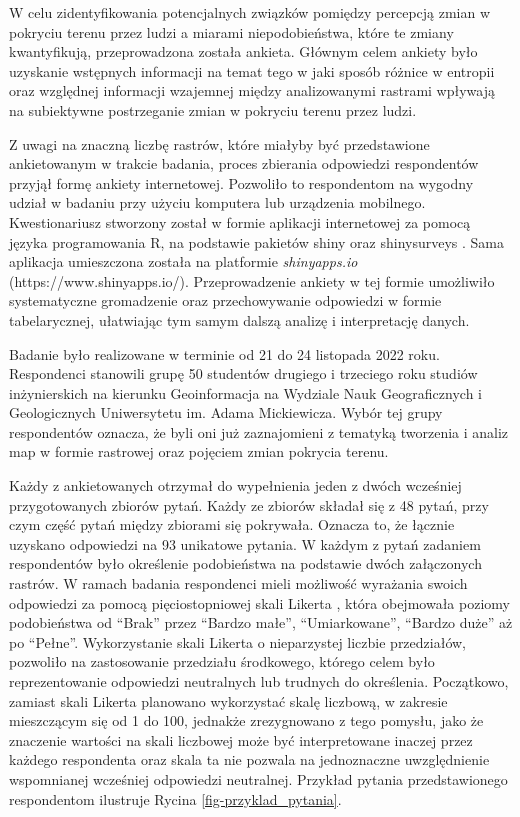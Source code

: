 \documentclass{amuthesis}
\begin{document}
W celu zidentyfikowania potencjalnych związków pomiędzy percepcją zmian
w pokryciu terenu przez ludzi a miarami niepodobieństwa, które te zmiany
kwantyfikują, przeprowadzona została ankieta. Głównym celem ankiety było
uzyskanie wstępnych informacji na temat tego w jaki sposób różnice w
entropii oraz względnej informacji wzajemnej między analizowanymi
rastrami wpływają na subiektywne postrzeganie zmian w pokryciu terenu
przez ludzi.

Z uwagi na znaczną liczbę rastrów, które miałyby być przedstawione
ankietowanym w trakcie badania, proces zbierania odpowiedzi respondentów
przyjął formę ankiety internetowej. Pozwoliło to respondentom na wygodny
udział w badaniu przy użyciu komputera lub urządzenia mobilnego.
Kwestionariusz stworzony został w formie aplikacji internetowej za
pomocą języka programowania R, na podstawie pakietów shiny
\autocite*{R-shiny} oraz shinysurveys \autocite*{R-shinysurveys}. Sama
aplikacja umieszczona została na platformie \emph{shinyapps.io}
(https://www.shinyapps.io/). Przeprowadzenie ankiety w tej formie
umożliwiło systematyczne gromadzenie oraz przechowywanie odpowiedzi w
formie tabelarycznej, ułatwiając tym samym dalszą analizę i
interpretację danych.

Badanie było realizowane w terminie od 21 do 24 listopada 2022 roku.
Respondenci stanowili grupę 50 studentów drugiego i trzeciego roku
studiów inżynierskich na kierunku Geoinformacja na Wydziale Nauk
Geograficznych i Geologicznych Uniwersytetu im. Adama Mickiewicza. Wybór
tej grupy respondentów oznacza, że byli oni już zaznajomieni z tematyką
tworzenia i analiz map w formie rastrowej oraz pojęciem zmian pokrycia
terenu.

Każdy z ankietowanych otrzymał do wypełnienia jeden z dwóch wcześniej
przygotowanych zbiorów pytań. Każdy ze zbiorów składał się z 48 pytań,
przy czym część pytań między zbiorami się pokrywała. Oznacza to, że
łącznie uzyskano odpowiedzi na 93 unikatowe pytania. W każdym z pytań
zadaniem respondentów było określenie podobieństwa na podstawie dwóch
załączonych rastrów. W ramach badania respondenci mieli możliwość
wyrażania swoich odpowiedzi za pomocą pięciostopniowej skali Likerta
\autocite{likert_scale}, która obejmowała poziomy podobieństwa od
``Brak'' przez ``Bardzo małe'', ``Umiarkowane'', ``Bardzo duże'' aż po
``Pełne''. Wykorzystanie skali Likerta o nieparzystej liczbie
przedziałów, pozwoliło na zastosowanie przedziału środkowego, którego
celem było reprezentowanie odpowiedzi neutralnych lub trudnych do
określenia. Początkowo, zamiast skali Likerta planowano wykorzystać
skalę liczbową, w zakresie mieszczącym się od 1 do 100, jednakże
zrezygnowano z tego pomysłu, jako że znaczenie wartości na skali
liczbowej może być interpretowane inaczej przez każdego respondenta oraz
skala ta nie pozwala na jednoznaczne uwzględnienie wspomnianej wcześniej
odpowiedzi neutralnej. Przykład pytania przedstawionego respondentom
ilustruje Rycina \ref{fig-przyklad_pytania}.
\end{document}
